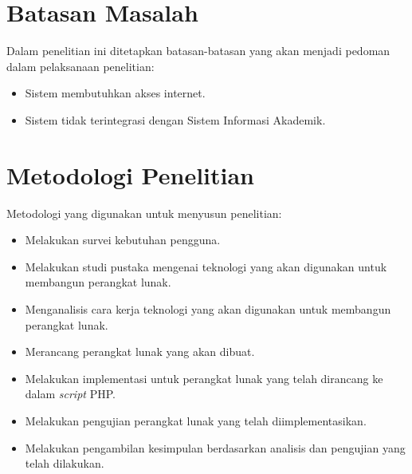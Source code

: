 \section{Batasan Masalah}
Dalam penelitian ini ditetapkan batasan-batasan yang akan menjadi pedoman dalam
pelaksanaan penelitian:
\begin{itemize}
    \item Sistem membutuhkan akses internet.
	\item Sistem tidak terintegrasi dengan Sistem Informasi Akademik.
\end{itemize}

\section{Metodologi Penelitian}
Metodologi yang digunakan untuk menyusun penelitian:
\begin{itemize}
    \item Melakukan survei kebutuhan pengguna.
	\item Melakukan studi pustaka mengenai teknologi yang akan digunakan untuk
	membangun perangkat lunak.
	\item Menganalisis cara kerja teknologi yang akan digunakan untuk membangun
	perangkat lunak.
	\item Merancang perangkat lunak yang akan dibuat.
	\item Melakukan implementasi untuk perangkat lunak yang
	telah dirancang ke dalam {\it script} PHP.
	\item Melakukan pengujian perangkat lunak yang telah diimplementasikan.
	\item Melakukan pengambilan kesimpulan berdasarkan analisis dan pengujian yang telah dilakukan.
\end{itemize}

